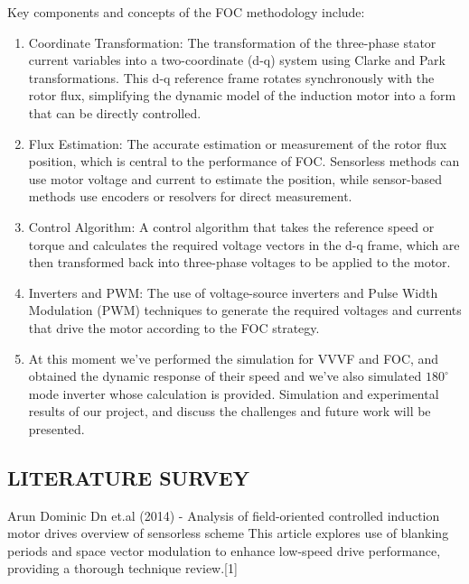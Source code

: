Key components and concepts of the FOC methodology include:
\begin{enumerate}
	\item  Coordinate Transformation: The transformation of the three-phase stator current variables into a two-coordinate (d-q) system using Clarke and Park transformations. This d-q reference frame rotates synchronously with the rotor flux, simplifying the dynamic model of the induction motor into a form that can be directly controlled.

	\item  Flux Estimation: The accurate estimation or measurement of the rotor flux position, which is central to the performance of FOC. Sensorless methods can use motor voltage and current to estimate the position, while sensor-based methods use encoders or resolvers for direct measurement.

	\item Control Algorithm: A control algorithm that takes the reference speed or torque and calculates the required voltage vectors in the d-q frame, which are then transformed back into three-phase voltages to be applied to the motor.

	\item Inverters and PWM: The use of voltage-source inverters and Pulse Width Modulation (PWM) techniques to generate the required voltages and currents that drive the motor according to the FOC strategy.

	\item At this moment we've performed the simulation for VVVF and FOC, and obtained the dynamic response of their speed and we've also simulated  $180^\circ$ mode inverter whose calculation is provided. Simulation and experimental results of our project, and discuss the challenges and future work will be presented.
\end{enumerate}
\subsection{LITERATURE SURVEY}



\hspace{0.2in}Arun Dominic Dn et.al (2014) - Analysis of field-oriented controlled induction motor drives overview of sensorless scheme This article  explores use of blanking periods and space vector modulation to enhance low-speed drive performance, providing a thorough technique review.[1]

\vspace{1mm} %

